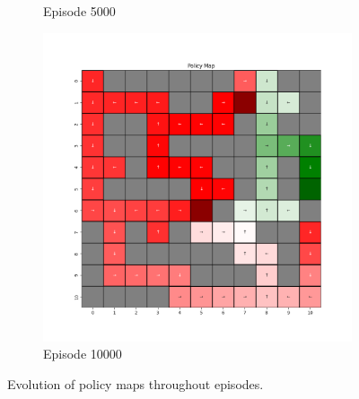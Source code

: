 \documentclass{assignment}
\begin{document}
\begin{figure}[H]
\begin{subfigure}{0.3\textwidth}
    \caption{Episode 5000}
    \end{subfigure}\hfill
    \begin{subfigure}{0.3\textwidth}
        \includegraphics[width=\textwidth]{figures/policy_q/default/policy_alpha_0.1_gamma_0.95_epsilon_0.2_iteration_10000.png}
    \caption{Episode 10000}
    \end{subfigure}
    \caption{Evolution of policy maps throughout episodes.}
    \label{fig:default_q_learning_policy}
\end{figure}
\end{document}
